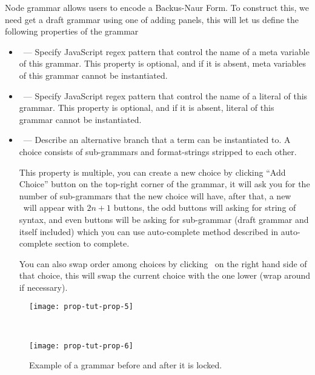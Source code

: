 \documentclass[master.tex]{subfiles}
\begin{document}
Node grammar allows users to encode a Backus-Naur Form. To construct this, we
need get a draft grammar using one of adding panels, this will let us define the
following properties of the grammar

\begin{itemize}
\item \kMetaVarRegex\ --- Specify JavaScript regex pattern that control the name
  of a meta variable of this grammar. This property is optional, and if it is
  absent, meta variables of this grammar cannot be instantiated.
\item \kLiteralRegex\ --- Specify JavaScript regex pattern that control the name
  of a literal of this grammar. This property is optional, and if it is
  absent, literal of this grammar cannot be instantiated.
\item \kChoice\ --- Describe an alternative branch that a term can be
  instantiated to. A choice consists of sub-grammars and format-strings stripped
  to each other.

  This property is multiple, you can create a new choice by clicking ``Add
  Choice'' button on the top-right corner of the grammar, it will ask you for
  the number of sub-grammars that the new choice will have, after that, a new
  \kChoice\ will appear with $2n + 1$ buttons, the odd buttons will asking for
  string of syntax, and even buttons will be asking for sub-grammar (draft
  grammar and itself included) which you can use auto-complete method described
  in auto-complete section to complete.

  You can also swap order among choices by clicking \swapButton\ on the right
  hand side of that choice, this will swap the current choice with the one lower
  (wrap around if necessary).
\end{itemize}

\begin{figure}[H]
    \centering

\begin{minipage}{0.48\textwidth}
\begin{flushleft}
    \texttt{[image: prop-tut-prop-5]}
\end{flushleft}
\end{minipage}
~
\begin{minipage}{0.48\textwidth}
\begin{flushright}
    \texttt{[image: prop-tut-prop-6]}
\end{flushright}
\end{minipage}
\caption{Example of a grammar before and after it is locked.}
\end{figure}
\end{document}
